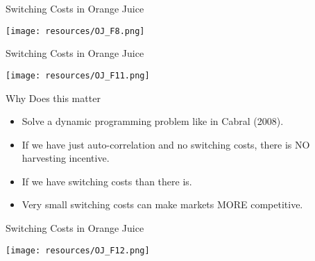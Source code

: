 \begin{frame}{Switching Costs in Orange Juice}
\begin{center}
\texttt{[image: resources/OJ\_F8.png]}
\end{center}
\end{frame}


\begin{frame}{Switching Costs in Orange Juice}
\begin{center}
\texttt{[image: resources/OJ\_F11.png]}
\end{center}
\end{frame}

\begin{frame}{Why Does this matter}
\begin{itemize}
\item Solve a dynamic programming problem like in Cabral (2008).
\item If we have just auto-correlation and no switching costs, there is NO harvesting incentive.
\item If we have switching costs than there is.
\item Very small switching costs can make markets MORE competitive.
\end{itemize}

\end{frame}


\begin{frame}{Switching Costs in Orange Juice}
\begin{center}
\texttt{[image: resources/OJ\_F12.png]}
\end{center}
\end{frame}
















































